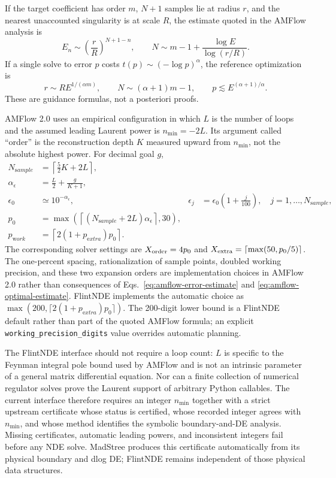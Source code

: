 \documentclass[11pt]{article}
\newcommand{\eps}{\epsilon}
\begin{document}
If the target coefficient has order $m$, $N+1$ samples lie at radius $r$, and the nearest
unaccounted singularity is at scale $R$, the estimate quoted in the AMFlow analysis is
\begin{equation}
  E_n\sim\left(\frac rR\right)^{N+1-n},
  \qquad
  N\sim m-1+\frac{\log E}{\log(r/R)}.
  \label{eq:amflow-error-estimate}
\end{equation}
If a single solve to error $p$ costs $t(p)\sim(-\log p)^\alpha$, the reference optimization is
\begin{equation}
  r\sim R E^{1/(\alpha m)},
  \qquad N\sim(\alpha+1)m-1,
  \qquad p\lesssim E^{(\alpha+1)/\alpha}.
  \label{eq:amflow-optimal-estimate}
\end{equation}
These are guidance formulas, not a posteriori proofs.

AMFlow 2.0 uses an empirical configuration \cite{Huang:2026rjb} in which $L$ is the number
of loops and the
assumed leading Laurent power is $n_{\min}=-2L$.  Its argument called ``order'' is the
reconstruction depth $K$ measured upward from $n_{\min}$, not the absolute highest power.
For decimal goal $g$,
\begin{align}
  N_{\mathrm sample}&=\left\lceil\frac52K+2L\right\rceil,\\
  \alpha_\eps&=\frac L2+\frac{g}{K+1},\\
  \eps_0&\simeq10^{-\alpha_\eps},
  &\eps_j&=\eps_0\left(1+\frac{j}{100}\right),\quad j=1,\ldots,N_{\mathrm sample},\\
  p_0&=\max\left(\left\lceil(N_{\mathrm sample}+2L)\alpha_\eps\right\rceil,30\right),\\
  p_{\mathrm work}&=\left\lceil2(1+p_{\mathrm extra})p_0\right\rceil.
  \label{eq:amflow-default-config}
\end{align}
The corresponding solver settings are $X_{\rm order}=4p_0$ and
$X_{\rm extra}=\lceil\max(50,p_0/5)\rceil$.  The one-percent spacing, rationalization of
sample points, doubled working precision, and these two expansion orders are implementation
choices in AMFlow 2.0 rather than consequences of Eqs.~\eqref{eq:amflow-error-estimate} and
\eqref{eq:amflow-optimal-estimate}.
FlintNDE implements the automatic choice as
$\max(200,\lceil2(1+p_{\mathrm extra})p_0\rceil)$.  The 200-digit lower bound is a
FlintNDE default rather than part of the quoted AMFlow formula; an explicit
\texttt{working\_precision\_digits} value overrides automatic planning.

The FlintNDE interface should not require a loop count: $L$ is specific to the Feynman
integral pole bound used by AMFlow and is not an intrinsic parameter of a general matrix
differential equation.  Nor can a finite collection of numerical regulator solves prove the
Laurent support of arbitrary Python callables.  The current interface therefore requires an
integer $n_{\min}$ together with a strict upstream certificate whose status is certified,
whose recorded integer agrees with $n_{\min}$, and whose method identifies the symbolic
boundary-and-DE analysis.  Missing certificates, automatic leading powers, and inconsistent
integers fail before any NDE solve.  MadStree produces this certificate automatically from its
physical boundary and dlog DE; FlintNDE remains independent of those physical data structures.
\end{document}
